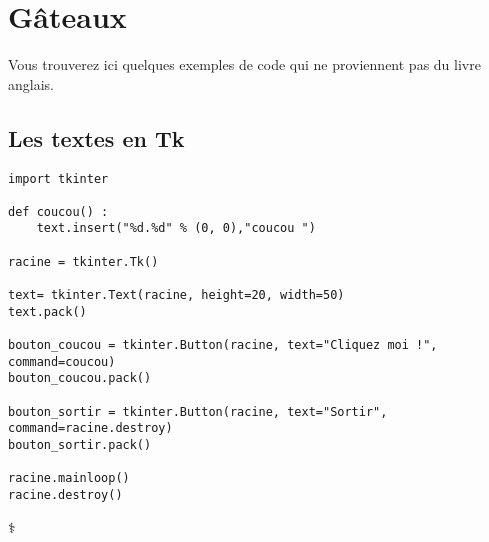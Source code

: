 
\chapter{Gâteaux}
Vous trouverez ici quelques exemples de code qui ne proviennent pas du livre anglais.
\section{Les textes en Tk}

\begin{Verbatim}[frame=single,rulecolor=\color{mbleu}, label=à taper]
import tkinter

def coucou() :
    text.insert("%d.%d" % (0, 0),"coucou ")

racine = tkinter.Tk()

text= tkinter.Text(racine, height=20, width=50)
text.pack()

bouton_coucou = tkinter.Button(racine, text="Cliquez moi !", command=coucou)
bouton_coucou.pack()

bouton_sortir = tkinter.Button(racine, text="Sortir", command=racine.destroy)
bouton_sortir.pack()

racine.mainloop()
racine.destroy()
\end{Verbatim}

\begin{center}
\textrm{⚕}
\end{center}


